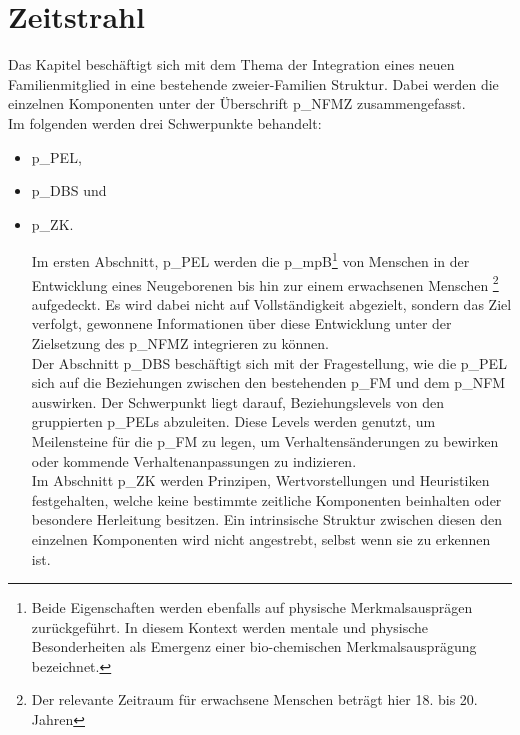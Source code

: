 

\section{Zeitstrahl}   

Das Kapitel beschäftigt sich mit dem Thema der Integration eines neuen Familienmitglied in eine bestehende zweier-Familien Struktur. Dabei werden die einzelnen Komponenten unter der Überschrift \gls{p_NFMZ} zusammengefasst.\\

Im folgenden werden drei Schwerpunkte behandelt: 
\begin{itemize}
	\item \gls{p_PEL},
	\item \gls{p_DBS} und
	\item \gls{p_ZK}.

Im ersten Abschnitt, \gls{p_PEL} werden die \gls{p_mpB}\footnote{Beide Eigenschaften werden ebenfalls auf physische Merkmalsausprägen zurückgeführt. In diesem Kontext werden mentale und physische Besonderheiten als Emergenz einer bio-chemischen Merkmalsausprägung bezeichnet.} von Menschen in der Entwicklung eines Neugeborenen bis hin zur einem erwachsenen Menschen \footnote{Der relevante Zeitraum für erwachsene Menschen beträgt hier 18. bis 20. Jahren} aufgedeckt. Es wird dabei nicht auf Vollständigkeit abgezielt, sondern das Ziel verfolgt, gewonnene Informationen über diese Entwicklung unter der Zielsetzung des \gls{p_NFMZ} integrieren zu können.\\

Der Abschnitt \gls{p_DBS} beschäftigt sich mit der Fragestellung, wie die \gls{p_PEL} sich auf die Beziehungen zwischen den bestehenden \gls{p_FM} und dem \gls{p_NFM} auswirken. Der Schwerpunkt liegt darauf, Beziehungslevels von den gruppierten \glspl{p_PEL} abzuleiten. Diese Levels werden genutzt, um Meilensteine für die \gls{p_FM} zu legen, um Verhaltensänderungen zu bewirken oder kommende Verhaltenanpassungen zu indizieren.\\

Im Abschnitt \gls{p_ZK} werden Prinzipen, Wertvorstellungen und Heuristiken festgehalten, welche keine bestimmte zeitliche Komponenten beinhalten oder besondere Herleitung besitzen. Ein intrinsische Struktur zwischen diesen den einzelnen Komponenten wird nicht angestrebt, selbst wenn sie zu erkennen ist.


\end{itemize}
